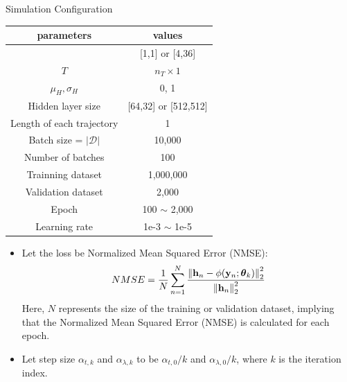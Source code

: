 \documentclass[hyperref={bookmarks=false}]{beamer}
\numberwithin{figure}{section}
\begin{document}
\begin{frame}[allowframebreaks]{Simulation Configuration}

\begin{table}[h]
    \centering
    \renewcommand{\arraystretch}{1.1}
    \begin{tabular}{|c|c|}
        \hline
        parameters   &values \\
        \hline \hline
        [$n_R,n_T$]                     &[1,1] or [4,36]        \\ \hline
        $T$                             &$n_T \times 1$         \\ \hline
        $\mu_H, \sigma_H$               &0, 1          \\ \hline
        Hidden layer size               &[64,32] or [512,512]   \\ \hline
        Length of each trajectory       &1                      \\ \hline
        Batch size = $|\mathcal{D}|$    &10,000         \\ \hline
        Number of batches               &100            \\ \hline
        Trainning dataset               &1,000,000      \\ \hline
        Validation dataset              &2,000          \\ \hline
        Epoch                           &100 $\sim$ 2,000   \\ \hline
        Learning rate                   &1e-3 $\sim$ 1e-5  \\ \hline
    \end{tabular}
    \end{table}

\framebreak

\begin{itemize}
    \item Let the loss be Normalized Mean Squared Error (NMSE):
        \begin{equation} \label{NMSE}
          NMSE=\frac{1}{N} \sum\limits_{n=1}^N
          \frac{\left\| {\bf h}_n-\phi(\mathbf{y}_n;\boldsymbol{\theta}_k) \right\|^2_2}
          {\left\| {\bf h}_n \right\|^2_2}
        \end{equation}
        Here, $N$ represents the size of the training or validation dataset, 
        implying that the Normalized Mean Squared Error (NMSE) is calculated for each epoch.
    \vspace{12pt}
    \item Let step size $\alpha_{t,k}$ and $\alpha_{\lambda,k}$ to be ${\alpha_{t,0}}/{k}$
        and ${\alpha_{\lambda,0}}/{k}$, where $k$ is the iteration index.
 
\end{itemize}
\end{frame}
\end{document}
